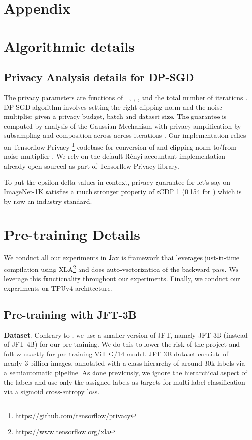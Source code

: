 \documentclass[letterpaper]{article} \usepackage{fullpage}
\begin{document}



\appendix
\section{Appendix}
\section{Algorithmic details}



\subsection{Privacy Analysis details for DP-SGD}
The privacy parameters  are functions of , , , , and the total number of iterations . DP-SGD algorithm involves setting the right clipping norm  and the noise multiplier  given a privacy budget, batch and dataset size. The  guarantee is computed by analysis of the Gaussian Mechanism with privacy amplification by subsampling and composition across across iterations \citep{KLNRS,Bassily_2014,abadi2016dpsgd,mironov2017renyi,mcmahan2017learning, mironov2019rnyi,Erlingsson_amplification_2019,zhu2019poission,feldman2020hiding,wang_subsampled_2020}.  Our implementation relies on Tensorflow Privacy \footnote{\url{https://github.com/tensorflow/privacy}} codebase for conversion of  and clipping norm  to/from noise multiplier .  We rely on the default R\'enyi accountant implementation already open-sourced as part of Tensorflow Privacy library.

To put the epsilon-delta values in context, privacy guarantee for let's say  on ImageNet-1K satisfies a much stronger property of zCDP  1 (0.154 for ) which is by now an industry standard.

\section{Pre-training Details}
We conduct all our experiments in Jax \citep{jax2018github,XLA} is framework that leverages just-in-time compilation using XLA\footnote{https://www.tensorflow.org/xla} and does auto-vectorization of the backward pass. We leverage this functionality throughout our experiments. Finally, we conduct our experiments on TPUv4 architecture.

\subsection{Pre-training with JFT-3B}
\textbf{Dataset.}
Contrary to \cite{mehta2022large,dm_transfer_2022}, we use a smaller version of JFT, namely JFT-3B (instead of JFT-4B) for our pre-training. We do this to lower the risk of the project and follow \cite{zhai2021scaling} exactly for pre-training ViT-G/14 model. JFT-3B dataset consists of nearly 3 billion images, annotated with a class-hierarchy of around 30k labels via a semiautomatic pipeline. As done previously, we ignore the hierarchical aspect of the labels and use only the assigned labels as targets for multi-label classification via a sigmoid cross-entropy loss.
\end{document}
